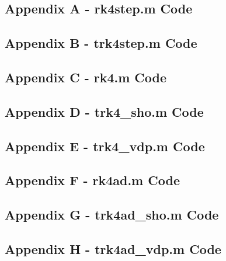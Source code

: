\documentclass[10pt]{article}
\begin{document}
\subsection*{Appendix A - rk4step.m Code}

\pagebreak

\subsection*{Appendix B - trk4step.m Code}

\pagebreak

\subsection*{Appendix C - rk4.m Code}

\pagebreak

\subsection*{Appendix D - trk4\_sho.m Code}

\pagebreak

\subsection*{Appendix E - trk4\_vdp.m Code}

\pagebreak

\subsection*{Appendix F - rk4ad.m Code}

\pagebreak

\subsection*{Appendix G - trk4ad\_sho.m Code}

\pagebreak

\subsection*{Appendix H - trk4ad\_vdp.m Code}

\pagebreak
\end{document}
